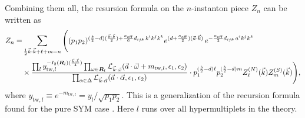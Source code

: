 \documentclass[letterpaper, 11pt]{article}
\newcommand{\nn}{\nonumber}
\def\CL{{\cal L}}
\def\a{\alpha}
\def\e{\epsilon}
\def\k{\kappa}
\def\w{\omega}
\def\D{\Delta}
\begin{document}
Combining them all, the resursion formula on the $n$-instanton piece $Z_n$ can be written as
\begin{align}
  \label{eq:recursion}
  Z_n = &\sum_{\frac{1}{2}\vec{k}\cdot\vec{k} + \ell + m = n}  
  \Bigg( (p_1p_2)^{(\frac{b}{2} -d) (\frac{\vec{k}\cdot\vec{k}}{2}) +\frac{\k_\text{eff}}{6}d_{ijk}\,k^ik^jk^k} e^{(d+\frac{\k_\text{eff}}{2})(\vec{a}\cdot\vec{k})}\,
 e^{-\frac{\k_\text{eff}}{2}d_{ijk}\,a^ik^jk^k} \\& 
 \times    \frac{\prod_{l} y_{\text{tw}, l}^{-I_2(\boldsymbol{R}_l)(\frac{\vec{k}\cdot\vec{k}}{4})} \prod_{\w \in \boldsymbol{R}_l} \CL_{\vec{k}\cdot\vec{\w}}(\vec{a}\cdot \vec{\w} + m_{\text{tw},l}, \e_1,\e_2)}{ \prod_{\a \in \D} \CL_{\vec{k} \cdot \vec{\a}} (\vec{a}\cdot\vec{\alpha}, \epsilon_1, \epsilon_2)}
 \cdot p_1^{(\frac{b}{2}-d)\ell}p_2^{(\frac{b}{2}-d)m}Z^{(N)}_{\ell}(\vec{k})  Z^{(S)}_m (\vec{k}) \Bigg) \nn,
 \end{align}
where $y_{\text{tw},l} \equiv e^{-m_{\text{tw},l}} = y_l / \sqrt{p_1p_2}$. This is a generalization of the recursion formula found for the pure SYM case \cite{Nakajima:2005fg,Gottsche:2006bm}. Here $l$ runs over all hypermultiplets in the theory.  
\end{document}
